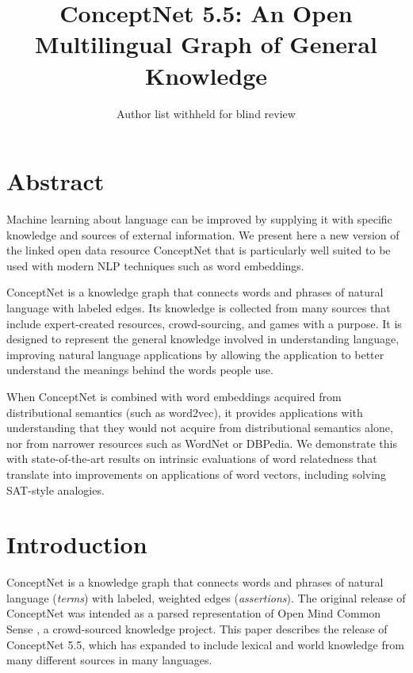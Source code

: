 \documentclass[letterpaper]{article}
\begin{document}
\title{ConceptNet 5.5: An Open Multilingual Graph of General Knowledge}
\author{Author list withheld for blind review}

\maketitle


\section{Abstract}\label{abstract}

Machine learning about language can be improved by supplying it with specific knowledge and sources of external information. We present here a new version of the linked open data resource ConceptNet that is particularly well suited to be used with modern NLP techniques such as word embeddings.

ConceptNet is a knowledge graph that connects words and phrases of natural language with labeled edges. Its knowledge is collected from many sources that include expert-created resources, crowd-sourcing, and games with a purpose. It is designed to represent the general knowledge involved in understanding language, improving natural language applications by allowing the application to better understand the meanings behind the words people use.

When ConceptNet is combined with word embeddings acquired from distributional semantics (such as word2vec), it provides applications with understanding that they would not acquire from distributional semantics alone, nor from narrower resources such as WordNet or DBPedia. We demonstrate this with state-of-the-art results on intrinsic evaluations of word relatedness that translate into improvements on applications of word vectors, including solving SAT-style analogies.


\section{Introduction}\label{introduction}

ConceptNet is a knowledge graph that connects words and phrases of
natural language (\emph{terms}) with labeled, weighted edges
(\emph{assertions}). The original release of ConceptNet \cite{liu2004conceptnet}
was intended as a parsed representation of Open Mind Common Sense
\cite{singh2002omcs}, a crowd-sourced knowledge project. This paper
describes the release of ConceptNet 5.5, which has expanded to include
lexical and world knowledge from many different sources in many
languages.
\end{document}

